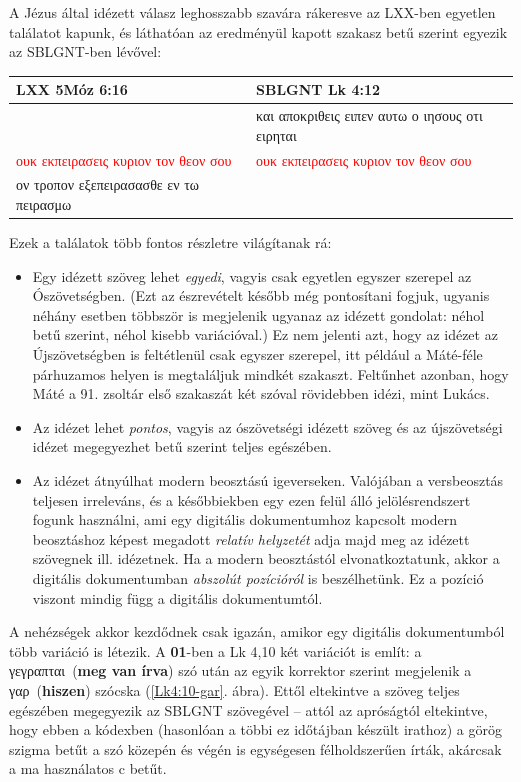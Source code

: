 \documentclass{article}
\newcommand\gr{\selectlanguage{greek}\frenchspacing}
\newcommand\hu{\selectlanguage{magyar}\frenchspacing}
\begin{document}
A Jézus által idézett válasz leghosszabb szavára rákeresve az LXX-ben egyetlen találatot kapunk,
és láthatóan az eredményül kapott szakasz betű szerint egyezik az SBLGNT-ben lévővel:
\begin{center}
\begin{tabular}{p{5cm} p{5cm}}
LXX 5Móz 6:16 & SBLGNT Lk 4:12\\
\hline
& {\gr και αποκριθεις ειπεν αυτω ο ιησους οτι ειρηται}\\
\gr \textcolor{red}{ουκ εκπειρασεις κυριον τον θεον σου} &
\gr \textcolor{red}{ουκ εκπειρασεις κυριον τον θεον σου} \\
\gr ον τροπον εξεπειρασασθε εν τω πειρασμω &
\end{tabular}
\end{center}
\hu
Ezek a találatok több fontos részletre világítanak rá:
\begin{itemize}
\item Egy idézett szöveg lehet \textit{egyedi}, vagyis csak egyetlen egyszer szerepel
az Ószövetségben. (Ezt az észrevételt később még pontosítani fogjuk, ugyanis néhány esetben
többször is megjelenik ugyanaz az idézett gondolat: néhol betű szerint, néhol kisebb variációval.)
Ez nem jelenti azt, hogy az idézet az Újszövetségben is feltétlenül csak egyszer szerepel, itt például
a Máté-féle párhuzamos helyen is megtaláljuk mindkét szakaszt. Feltűnhet azonban, hogy Máté a 91. zsoltár első szakaszát
két szóval rövidebben idézi, mint Lukács. 
\item Az idézet lehet \textit{pontos}, vagyis az ószövetségi idézett szöveg és az újszövetségi idézet megegyezhet
betű szerint teljes egészében.
\item Az idézet átnyúlhat modern beosztású igeverseken. Valójában a versbeosztás teljesen irreleváns,
és a későbbiekben egy ezen felül álló jelölésrendszert fogunk használni, ami egy digitális dokumentumhoz kapcsolt
modern beosztáshoz képest megadott \textit{relatív helyzetét} adja majd meg az idézett szövegnek ill. idézetnek.
Ha a modern beosztástól elvonatkoztatunk, akkor a digitális dokumentumban \textit{abszolút pozícióról} is beszélhetünk.
Ez a pozíció viszont mindig függ a digitális dokumentumtól.
\end{itemize}

A nehézségek akkor kezdődnek csak igazán, amikor egy digitális dokumentumból több variáció is létezik.
A \textbf{01}-ben a Lk 4,10 két variációt is említ: a \gr γεγραπται\hu\ (\textbf{meg van írva}) szó után az egyik
korrektor szerint megjelenik a \gr γαρ\hu\ (\textbf{hiszen}) szócska (\ref{Lk4:10-gar}. ábra). Ettől eltekintve a szöveg
teljes egészében megegyezik az SBLGNT szövegével -- attól az apróságtól eltekintve, hogy ebben a kódexben
(hasonlóan a többi ez időtájban készült irathoz) a görög szigma betűt a szó közepén és végén is
egységesen félholdszerűen írták, akárcsak a ma használatos c betűt.
\end{document}
